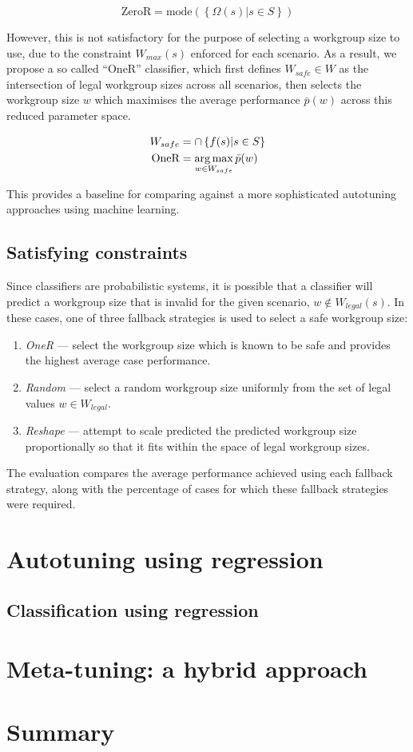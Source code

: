\begin{equation}
\text{ZeroR} = \text{mode}( \left\{ \Omega(s) | s \in S \right\} )
\end{equation}

However, this is not satisfactory for the purpose of selecting a
workgroup size to use, due to the constraint $W_{max}(s)$ enforced for
each scenario. As a result, we propose a so called ``OneR''
classifier, which first defines $W_{safe} \in W$ as the intersection
of legal workgroup sizes across all scenarios, then selects the
workgroup size $w$ which maximises the average performance
$\bar{p}(w)$ across this reduced parameter space.

\begin{align}
W_{safe} &= \cap \left\{ f(s) | s \in S \right\} \\
\text{OneR} &= \operatorname*{arg\,max}_{w \in W_{safe}} \bar{p}(w)
\end{align}

This provides a baseline for comparing against a more sophisticated
autotuning approaches using machine learning.

\subsection{Satisfying constraints}

Since classifiers are probabilistic systems, it is possible that a
classifier will predict a workgroup size that is invalid for the given
scenario, $w \not\in W_{legal}(s)$. In these cases, one of three
fallback strategies is used to select a safe workgroup size:

\begin{enumerate}
\item \emph{OneR} --- select the workgroup size which is known to be
  safe and provides the highest average case performance.
\item \emph{Random} --- select a random workgroup size uniformly from
  the set of legal values $w \in W_{legal}$.
\item \emph{Reshape} --- attempt to scale predicted the predicted
  workgroup size proportionally so that it fits within the space of
  legal workgroup sizes.
\end{enumerate}

The evaluation compares the average performance achieved using each
fallback strategy, along with the percentage of cases for which these
fallback strategies were required.


\section{Autotuning using regression}

\subsection{Classification using regression}


\section{Meta-tuning: a hybrid approach}


\section{Summary}
